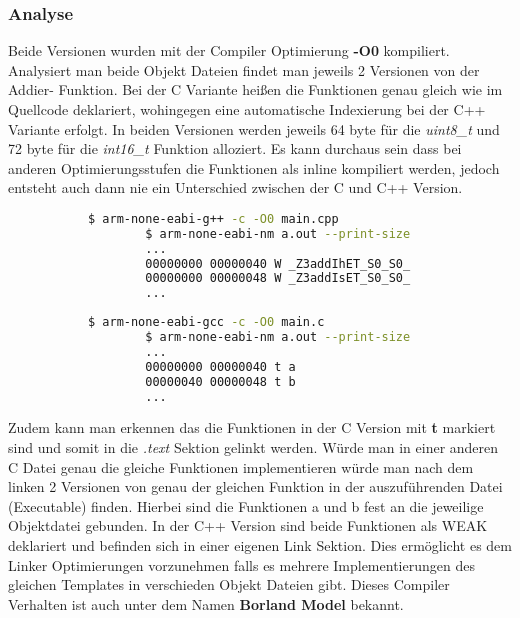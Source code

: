 \documentclass[MES,Master,ngerman]{twbook}%
\begin{document}
\subsubsection{Analyse}

Beide Versionen wurden mit der Compiler Optimierung \textbf{-O0} kompiliert. Analysiert man beide Objekt Dateien findet man jeweils 2 Versionen von der Addier- Funktion. Bei der C Variante heißen die Funktionen genau gleich wie im Quellcode deklariert, wohingegen eine automatische Indexierung bei der C++ Variante erfolgt. In beiden Versionen werden jeweils 64 byte für die \textit{uint8\_t} und 72 byte für die \textit{int16\_t} Funktion alloziert. Es kann durchaus sein dass bei anderen Optimierungsstufen die Funktionen als inline kompiliert werden, jedoch entsteht auch dann nie ein Unterschied zwischen der C und C++ Version.


\begin{figure}[!htb]
	\begin{subfigure}[b]{0.5\textwidth}
		\begin{lstlisting}[gobble=6, title={Analyse C++}, language=bash, numbers=none]
		$ arm-none-eabi-g++ -c -O0 main.cpp
		$ arm-none-eabi-nm a.out --print-size
		...
		00000000 00000040 W _Z3addIhET_S0_S0_
		00000000 00000048 W _Z3addIsET_S0_S0_
		...
		\end{lstlisting}
	\end{subfigure}
	\begin{subfigure}[b]{0.5\textwidth}
		\begin{lstlisting}[gobble=6, title={Analyse C}, language=bash, numbers=none]
		$ arm-none-eabi-gcc -c -O0 main.c
		$ arm-none-eabi-nm a.out --print-size
		...
		00000000 00000040 t a
		00000040 00000048 t b
		...
		\end{lstlisting}
	\end{subfigure}
\end{figure}

Zudem kann man erkennen das die Funktionen in der C Version mit \textbf{t} markiert sind und somit in die \textit{.text} Sektion gelinkt werden. Würde man in einer anderen C Datei genau die gleiche Funktionen implementieren würde man nach dem linken 2 Versionen von genau der gleichen Funktion in der auszuführenden Datei (Executable) finden. Hierbei sind die Funktionen a und b fest an die jeweilige Objektdatei gebunden. In der C++ Version sind beide Funktionen als WEAK deklariert und befinden sich in einer eigenen Link Sektion. Dies ermöglicht es dem Linker Optimierungen vorzunehmen falls es mehrere Implementierungen des gleichen Templates in verschieden Objekt Dateien gibt. Dieses Compiler Verhalten ist auch unter dem Namen \textbf{Borland Model} bekannt.
\end{document}
